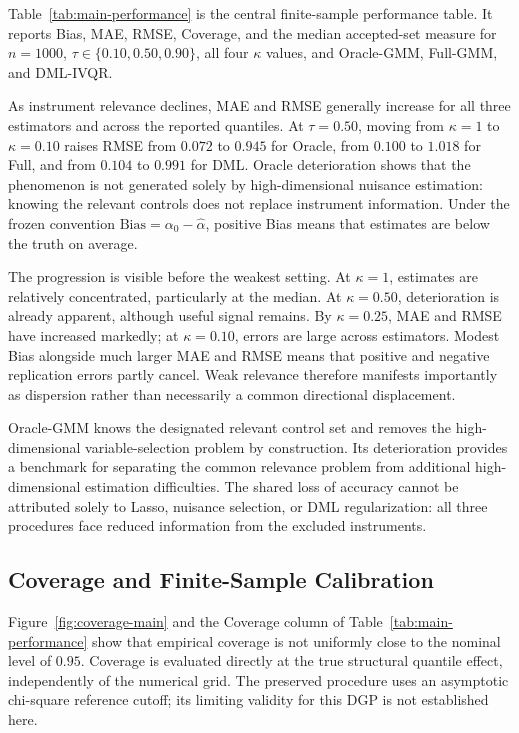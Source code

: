 Table~\ref{tab:main-performance} is the central finite-sample performance table. It reports Bias, MAE, RMSE, Coverage, and the median accepted-set measure for $n=1000$, $\tau\in\{0.10,0.50,0.90\}$, all four $\kappa$ values, and Oracle-GMM, Full-GMM, and DML-IVQR.



As instrument relevance declines, MAE and RMSE generally increase for all three estimators and across the reported quantiles. At $\tau=0.50$, moving from $\kappa=1$ to $\kappa=0.10$ raises RMSE from $0.072$ to $0.945$ for Oracle, from $0.100$ to $1.018$ for Full, and from $0.104$ to $0.991$ for DML. Oracle deterioration shows that the phenomenon is not generated solely by high-dimensional nuisance estimation: knowing the relevant controls does not replace instrument information. Under the frozen convention $\mathrm{Bias}=\alpha_0-\widehat{\alpha}$, positive Bias means that estimates are below the truth on average.

The progression is visible before the weakest setting. At $\kappa=1$, estimates are relatively concentrated, particularly at the median. At $\kappa=0.50$, deterioration is already apparent, although useful signal remains. By $\kappa=0.25$, MAE and RMSE have increased markedly; at $\kappa=0.10$, errors are large across estimators. Modest Bias alongside much larger MAE and RMSE means that positive and negative replication errors partly cancel. Weak relevance therefore manifests importantly as dispersion rather than necessarily a common directional displacement.

Oracle-GMM knows the designated relevant control set and removes the high-dimensional variable-selection problem by construction. Its deterioration provides a benchmark for separating the common relevance problem from additional high-dimensional estimation difficulties. The shared loss of accuracy cannot be attributed solely to Lasso, nuisance selection, or DML regularization: all three procedures face reduced information from the excluded instruments.

\subsection{Coverage and Finite-Sample Calibration}

Figure~\ref{fig:coverage-main} and the Coverage column of Table~\ref{tab:main-performance} show that empirical coverage is not uniformly close to the nominal level of $0.95$. Coverage is evaluated directly at the true structural quantile effect, independently of the numerical grid. The preserved procedure uses an asymptotic chi-square reference cutoff; its limiting validity for this DGP is not established here.

